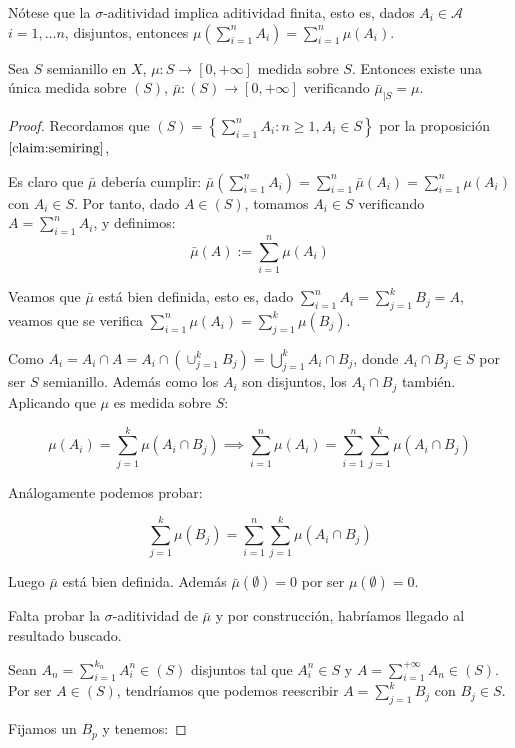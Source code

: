 Nótese que la $\sigma$-aditividad implica aditividad finita, esto es, dados $A_i \in \mathcal{A}$ $i=1, \ldots n$,
disjuntos, entonces $\mu\left(\sum_{i=1}^{n} A_i \right)= \sum_{i=1}^{n} \mu(A_i)$.

\begin{theorem}
 Sea $S$ semianillo en $X$, $\mu: S \rightarrow [0,+\infty]$ medida sobre $S$. Entonces existe una única medida 
 sobre $(S)$, $\bar{\mu}: (S) \rightarrow [0,+\infty]$ verificando $\bar{\mu}_{|S} = \mu$.
\end{theorem}

\begin{proof}
 Recordamos que $(S) = \left\{\sum_{i=1}^n A_i: n\ge 1, A_i \in S \right\}$ por la proposición $\ref{claim:semiring}$,
 
 Es claro que $\bar{\mu}$ debería cumplir: 
 $\bar{\mu}\left(\sum_{i=1}^n A_i\right) = \sum_{i=1}^n \bar{\mu}(A_i) = \sum_{i=1}^n \mu(A_i)$
 con $A_i \in S$. Por tanto, dado $A\in (S)$, tomamos $A_i\in S$ verificando $A = \sum_{i=1}^n A_i$, y definimos: 
 \[\bar{\mu}(A) := \sum_{i=1}^n \mu(A_i)\]
 
 Veamos que $\bar{\mu}$ está bien definida, esto es, dado $\sum_{i=1}^n A_i = \sum_{j=1}^k B_j = A$, 
 veamos que se verifica $\sum_{i=1}^n \mu(A_i) = \sum_{j=1}^k \mu(B_j)$.
 
 Como $A_i = A_i \cap A = A_i \cap \left(\cup_{j=1}^k B_j\right) = \bigcup_{j=1}^k A_i \cap B_j$, donde 
 $A_i \cap B_j \in S$ por ser $S$ semianillo. Además como los $A_i$ son disjuntos, los $A_i\cap B_j$ también.
 Aplicando que $\mu$ es medida sobre $S$:
 
 \[\mu(A_i) = \sum_{j=1}^k \mu(A_i \cap B_j) \implies \sum_{i=1}^n \mu(A_i) = 
              \sum_{i=1}^n \sum_{j=1}^k \mu(A_i \cap B_j)\]
 
 Análogamente podemos probar:
 
 \[\sum_{j=1}^k \mu(B_j) = \sum_{i=1}^n \sum_{j=1}^k \mu(A_i \cap B_j)\]
 
 Luego $\bar{\mu}$ está bien definida. Además $\bar{\mu} (\emptyset) = 0$ por ser $\mu(\emptyset) = 0$.
 
 Falta probar la $\sigma$-aditividad de $\bar{\mu}$ y por construcción, habríamos llegado al resultado buscado.
 
 Sean $A_n = \sum_{i=1}^{k_n} A_i^n \in (S)$ disjuntos tal que $A_i^n \in S$ y $A = \sum_{i=1}^{+\infty} A_n \in (S)$. 
 Por ser $A \in (S)$, tendríamos que podemos reescribir $A = \sum_{j=1}^k B_j$ con $B_j \in S$.
 
 Fijamos un $B_p$ y tenemos:
 

\end{proof}
